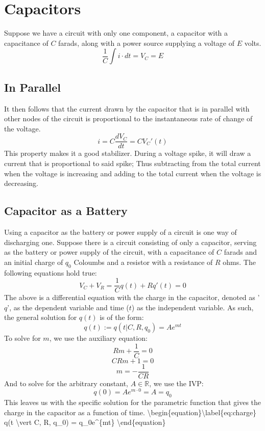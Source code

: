 \hypertarget{b11b46ae}{}
\begin{Shaded}
\begin{Highlighting}[]
\end{Highlighting}
\end{Shaded}

\hypertarget{e988cc97}{}
\hypertarget{capacitors}{%
\section{Capacitors}\label{capacitors}}

Suppose we have a circuit with only one component, a capacitor with a
capacitance of \(C\) farads, along with a power source supplying a
voltage of \(E\) volts. \[ \frac{1}{C} \int i \cdot dt = V_C = E\]

\hypertarget{in-parallel}{%
\subsection{In Parallel}\label{in-parallel}}

It then follows that the current drawn by the capacitor that is in
parallel with other nodes of the circuit is proportional to the
instantaneous rate of change of the voltage.
\[ i = C \frac{dV_C}{dt} = C V_C'(t)\] This property makes it a good
stabilizer. During a voltage spike, it will draw a current that is
proportional to said spike; Thus subtracting from the total current when
the voltage is increasing and adding to the total current when the
voltage is decreasing.

\hypertarget{capacitor-as-a-battery}{%
\subsection{Capacitor as a Battery}\label{capacitor-as-a-battery}}

Using a capacitor as the battery or power supply of a circuit is one way
of discharging one. Suppose there is a circuit consisting of only a
capacitor, serving as the battery or power supply of the circuit, with a
capacitance of \(C\) farads and an initial charge of \(q_0\) Coloumbs
and a resistor with a resistance of \(R\) ohms. The following equations
hold true: \[ V_C + V_R = \frac{1}{C}q(t) + Rq'(t) = 0\] The above is a
differential equation with the charge in the capacitor, denoted as
'\(q\)', as the dependent variable and time (\(t\)) as the independent
variable. As such, the general solution for \(q(t)\) is of the form:
\[ q(t) := q(t \vert C, R, q_0) = Ae^{mt}\] To solve for \(m\), we use
the auxiliary equation: \[Rm + \frac{1}{C} = 0\] \[CRm + 1 = 0\]
\[m = - \frac{1}{CR}\] And to solve for the arbitrary constant,
\(A \in \mathbb{R}\), we use the IVP:
\[ q(0) = Ae^{m \cdot 0} = A = q_0\] This leaves us with the specific
solution for the parametric function that gives the charge in the
capacitor as a function of time.
\textbackslash begin\{equation\}\textbackslash label\{eq:charge\} q(t
\textbackslash vert C, R, q\_0) = q\_0e\^{}\{mt\}
\textbackslash end\{equation\}

